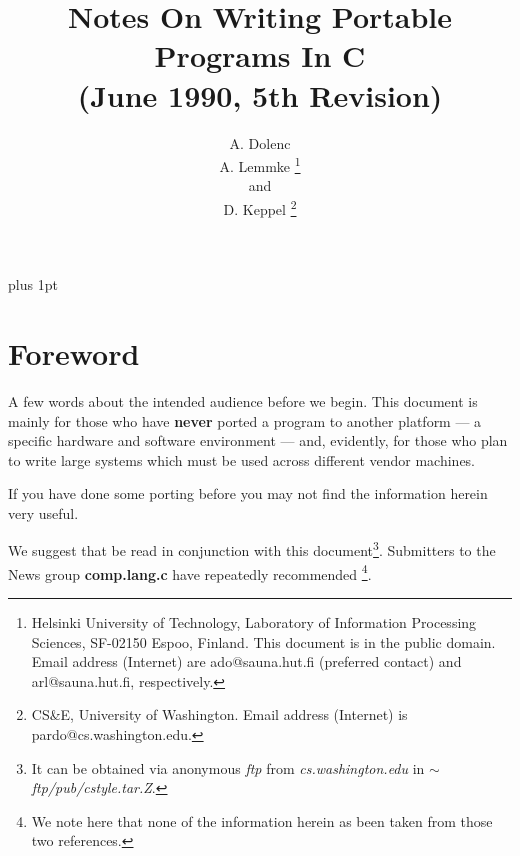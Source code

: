 
\pagestyle{headings}



\title{Notes On Writing Portable Programs In C\\
       {\small (June 1990, 5th Revision)}
      }

\author{A. Dolenc \\
        A. Lemmke
  \protect\thanks{Helsinki University of Technology,
  Laboratory of Information Processing Sciences, SF-02150 Espoo, Finland.
  This document is in the public domain.
  Email address (Internet) are ado@sauna.hut.fi (preferred contact)
  and arl@sauna.hut.fi, respectively.}
         \\ and \\
         D. Keppel
  \protect\thanks{CS\&E, University of Washington. Email address (Internet) is
   pardo@cs.washington.edu.}
   }
\maketitle

\tableofcontents


\parskip=6pt plus 1pt
\parindent=0pt

\section{Foreword}

A few words about the intended audience before we begin. This document
is mainly for those who have {\bf never} ported a program to another
platform --- a specific hardware and software environment ---
and, evidently, for those who plan to write large systems which
must be used across different vendor machines.

If you have done some porting before you may not find the information herein
very useful.

We suggest that \cite{kn:style} be read in conjunction with this
 document\footnote{It can be obtained via anonymous {\em ftp} from
 {\em cs.washington.edu} in {\em $\sim$ftp/pub/cstyle.tar.Z}.}.
Submitters to the News group {\bf comp.lang.c} have repeatedly recommended
\cite{kn:MH,kn:AK}\footnote{We note here that none of the information herein
as been taken from those two references.}.

